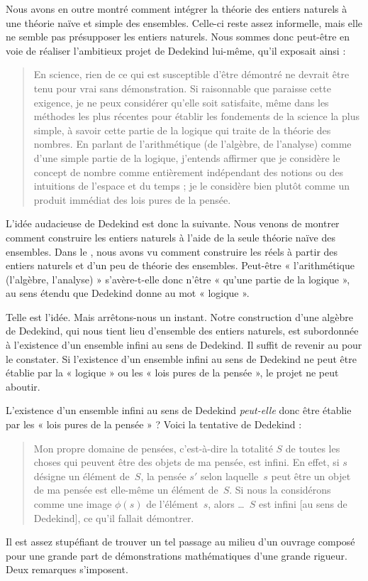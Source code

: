 \documentclass[../../../include/open-logic-section]{subfiles}
\begin{document}
Nous avons en outre montré comment intégrer la théorie des entiers
naturels à une théorie naïve et simple des ensembles. Celle-ci reste
assez informelle, mais elle ne semble pas présupposer les entiers naturels.
Nous sommes donc peut-être en voie de réaliser l'ambitieux projet de
Dedekind lui-même, qu'il exposait ainsi :
\begin{quote}
En science, rien de ce qui est susceptible d'être démontré ne devrait
être tenu pour vrai sans démonstration. Si raisonnable que paraisse cette
exigence, je ne peux considérer qu'elle soit satisfaite, même dans les
méthodes les plus récentes pour établir les fondements de la science
la plus simple, à savoir cette partie de la logique qui traite de la
théorie des nombres. En parlant de l'arithmétique (de l'algèbre,
de l'analyse) comme d'une simple partie de la logique, j'entends affirmer
que je considère le concept de nombre comme entièrement indépendant
des notions ou des intuitions de l'espace et du temps ; je le considère
bien plutôt comme un produit immédiat des lois pures de la pensée.
\citep[préface]{Dedekind1888}
\end{quote}
L'idée audacieuse de Dedekind est donc la suivante. Nous venons de montrer
comment construire les entiers naturels à l'aide de la seule théorie
naïve des ensembles. Dans le ,
nous avons vu comment construire les réels à partir des entiers naturels
et d'un peu de théorie des ensembles. Peut-être « l'arithmétique
(l'algèbre, l'analyse) » s'avère-t-elle donc n'être « qu'une partie
de la logique », au sens étendu que Dedekind donne au mot « logique ».

Telle est l'idée. Mais arrêtons-nous un instant. Notre construction
d'une algèbre de Dedekind, qui nous tient lieu d'ensemble des entiers
naturels, est subordonnée à l'existence d'un ensemble infini au sens
de Dedekind. Il suffit de revenir au
pour le constater. Si l'existence d'un ensemble infini au sens de
Dedekind ne peut être établie par la « logique » ou les « lois pures
de la pensée », le projet ne peut aboutir.

L'existence d'un ensemble infini au sens de Dedekind \emph{peut-elle}
donc être établie par les « lois pures de la pensée » ? Voici la
tentative de Dedekind :
\begin{quote}
Mon propre domaine de pensées, c'est-à-dire la totalité $S$ de toutes
les choses qui peuvent être des objets de ma pensée, est infini.
En effet, si $s$ désigne un élément de~$S$, la pensée $s'$ selon
laquelle~$s$ peut être un objet de ma pensée est elle-même un élément
de~$S$. Si nous la considérons comme une image $\phi(s)$ de
l'élément~$s$, alors \dots~$S$ est infini [au sens de Dedekind],
ce qu'il fallait démontrer.
\citep[\S66]{Dedekind1888}
\end{quote}
Il est assez stupéfiant de trouver un tel passage au milieu d'un ouvrage
composé pour une grande part de démonstrations mathématiques d'une
grande rigueur. Deux remarques s'imposent.
\end{document}
